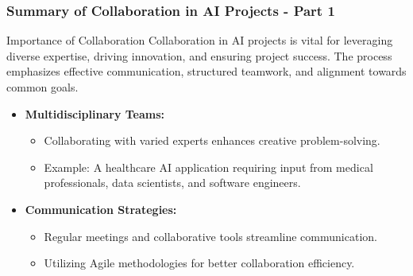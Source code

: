 \documentclass[aspectratio=169]{beamer}
\begin{document}
\begin{frame}[fragile]
    \frametitle{Summary of Collaboration in AI Projects - Part 1}
    \begin{block}{Importance of Collaboration}
        Collaboration in AI projects is vital for leveraging diverse expertise, driving innovation, and ensuring project success. The process emphasizes effective communication, structured teamwork, and alignment towards common goals.
    \end{block}
    
    \begin{itemize}
        \item \textbf{Multidisciplinary Teams:}
        \begin{itemize}
            \item Collaborating with varied experts enhances creative problem-solving.
            \item Example: A healthcare AI application requiring input from medical professionals, data scientists, and software engineers.
        \end{itemize}

        \item \textbf{Communication Strategies:}
        \begin{itemize}
            \item Regular meetings and collaborative tools streamline communication.
            \item Utilizing Agile methodologies for better collaboration efficiency.
        \end{itemize}
    \end{itemize}
\end{frame}
\end{document}
